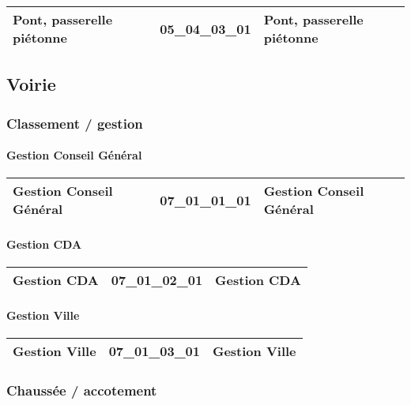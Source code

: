\documentclass[12pt,titlepage]{book}
\begin{document}
\renewcommand{\arraystretch}{1.2}
\begin{supertabular}{|p{10cm}|c|p{15cm}|}
 Pont, passerelle piétonne & 05\_04\_03\_01 & Pont, passerelle piétonne\\
\hline
\end{supertabular}
\subsection{Voirie}
\subsubsection{\large Classement / gestion}
\paragraph{Gestion Conseil Général}
\noindent
\vspace{\baselineskip}

\renewcommand{\arraystretch}{1.2}
\begin{supertabular}{|p{10cm}|c|p{15cm}|}
 Gestion Conseil Général & 07\_01\_01\_01 & Gestion Conseil Général\\
\hline
\end{supertabular}


\paragraph{Gestion CDA}
\noindent
\vspace{\baselineskip}

\renewcommand{\arraystretch}{1.2}
\begin{supertabular}{|p{10cm}|c|p{15cm}|}
 Gestion CDA & 07\_01\_02\_01 & Gestion CDA\\
\hline
\end{supertabular}


\paragraph{Gestion Ville}
\noindent
\vspace{\baselineskip}

\renewcommand{\arraystretch}{1.2}
\begin{supertabular}{|p{10cm}|c|p{15cm}|}
 Gestion Ville & 07\_01\_03\_01 & Gestion Ville\\
\hline
\end{supertabular}

\subsubsection{\large Chaussée / accotement}
\end{document}
